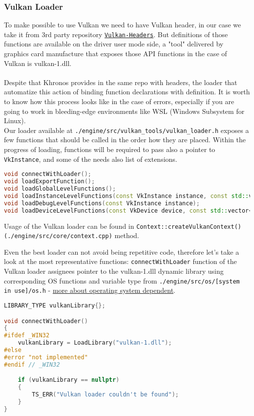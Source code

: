 \newpage

\subsubsection{Vulkan Loader}
To make possible to use Vulkan we need to have Vulkan header, in our case we take it from 3rd party repository  \hyperref[sec:3rdparty]{\texttt{Vulkan-Headers}}. But definitions of those functions are available on the driver user mode side, a "tool" delivered by graphics card manufacture that exposes those API functions in the case of Vulkan is vulkan-1.dll.\\\\
Despite that Khronos provides in the same repo with headers, the loader that automatize this action of binding function declarations with definition. It is worth to know how this process looks like in the case of errors, especially if you are going to work in bleeding-edge environments like WSL (Windows Subsystem for Linux).\\
Our loader available at \texttt{./engine/src/vulkan\_tools/vulkan\_loader.h} exposes a few functions that should be called in the order how they are placed. Within the progress of loading, functions will be required to pass also a pointer to \texttt{VkInstance}, and some of the needs also list of extensions.
\begin{lstlisting}[language=c++, caption=(./engine/src/vulkan\_tools/vulkan\_loader.h)]
void connectWithLoader();
void loadExportFunction();
void loadGlobalLevelFunctions();
void loadInstanceLevelFunctions(const VkInstance instance, const std::vector<std::string>& vulkanInstanceExtensions);
void loadDebugLevelFunctions(const VkInstance instance);
void loadDeviceLevelFunctions(const VkDevice device, const std::vector<std::string>& enabledVulkanDeviceExtensions);
\end{lstlisting}
Usage of the Vulkan loader can be found in \texttt{Context::createVulkanContext() (./engine/src/core/context.cpp)} method.

Even the best loader can not avoid being repetitive code, therefore let's take a look at the most representative functions:
\texttt{connectWithLoader} function of the Vulkan loader assignees pointer to the vulkan-1.dll dynamic library using corresponding OS functions and variable type from \texttt{./engine/src/os/[system in use]/os.h} -  \hyperref[sec:os]{more about operating system dependent}.
\begin{lstlisting}[language=c++, caption=Connecting with the Vulkan-1.dll (./engine/src/vulkan\_tools/vulkan\_loader.cpp)]
LIBRARY_TYPE vulkanLibrary{};

void connectWithLoader()
{
#ifdef _WIN32
    vulkanLibrary = LoadLibrary("vulkan-1.dll");
#else
#error "not implemented"
#endif // _WIN32

    if (vulkanLibrary == nullptr)
    {
        TS_ERR("Vulkan loader couldn't be found");
    }
}
\end{lstlisting}

